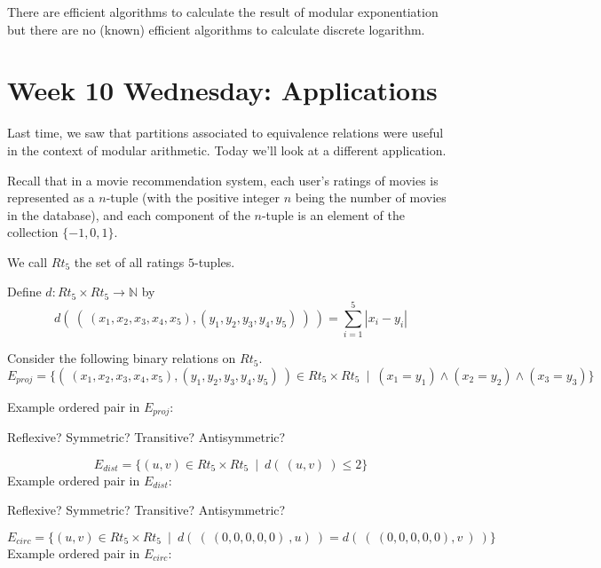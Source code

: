 \documentclass[12pt, oneside]{article}
\begin{document}
There are efficient algorithms to calculate the result of modular exponentiation 
but there are no (known) efficient algorithms to calculate discrete logarithm. \newpage
\section*{Week 10 Wednesday: Applications}

Last time, we saw that partitions associated to equivalence relations
were useful in the context of modular arithmetic.
Today we'll look at a different application.


Recall that 
in a movie recommendation system, each 
user's ratings of movies is represented as a $n$-tuple 
(with the positive integer $n$ 
being the number of movies in the database), 
and each component of 
the $n$-tuple is an element of the collection $\{-1,0,1\}$. 

We call $Rt_5$ the set of all ratings $5$-tuples.

Define $d: Rt_5 \times Rt_5 \to \mathbb{N}$ by
\[
    d (~(~ (x_1, x_2, x_3, x_4, x_5), (y_1, y_2, y_3, y_4, y_5) ~) ~) = \sum_{i=1}^5 |x_i - y_i|
\]

Consider the following binary relations on $Rt_5$.
\[
    E_{proj} =  \{ ( ~(x_1, x_2, x_3, x_4, x_5), (y_1, y_2, y_3, y_4, y_5)~) \in
         Rt_5 \times Rt_5 ~\mid~(x_1 = y_1) \land  (x_2 = y_2) \land (x_3 = y_3) \}
\]

Example ordered pair in $E_{proj}$: 

\vspace{20pt}

Reflexive? Symmetric? Transitive? Antisymmetric?

\vspace{120pt}



\[
    E_{dist} =  \{ (u,v) \in Rt_5 \times Rt_5 ~\mid~ d( ~(u,v)~ ) \leq 2 \}
\]
Example ordered pair in $E_{dist}$: 

\vspace{20pt}

Reflexive? Symmetric? Transitive? Antisymmetric?

\vspace{120pt}


\[
E_{circ} =  \{ (u,v) \in Rt_5 \times Rt_5 ~\mid~ d(~ ( ~(0,0,0,0,0)~, u)~ ) =  d( ~(~(0,0,0,0,0),v~)~) \}
\]
Example ordered pair in $E_{circ}$: 

\vspace{20pt}
\end{document}
